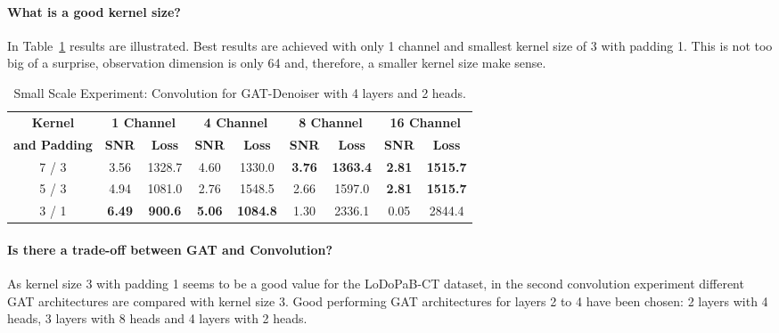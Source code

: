 \paragraph{What is a good kernel size?}

In Table~\ref{tab:small_convolution} results are illustrated. 
Best results are achieved with only 1 channel and smallest kernel size of 3 with padding 1.
This is not too big of a surprise, observation dimension is only 64 and, therefore, a smaller kernel size make sense.


\begin{table}[H]
  \centering
  \begin{tabular}{c|cc|cc|cc|cc}
    \toprule
    \small \textbf{Kernel}  & \multicolumn{2}{c|}{\small \textbf{1 Channel}} & \multicolumn{2}{c|}{\small \textbf{4 Channel}} & \multicolumn{2}{c|}{\small \textbf{8 Channel}} & \multicolumn{2}{c}{\small \textbf{16 Channel}} \\
    \small \textbf{and Padding}  & \small \textbf{SNR} & \small \textbf{Loss} & \small \textbf{SNR} & \small \textbf{Loss} & \small \textbf{SNR} & \small \textbf{Loss} & \small \textbf{SNR} & \small \textbf{Loss} \\ 
    \midrule
      7 / 3 & 3.56 & 1328.7                  & 4.60  &  1330.0                   & \textbf{3.76} & \textbf{1363.4} & \textbf{2.81}  & \textbf{1515.7} \\ \hline
      5 / 3 & 4.94 & 1081.0                  & 2.76  &  1548.5                   & 2.66 & 1597.0                   & \textbf{2.81}  & \textbf{1515.7} \\ \hline
      3 / 1 & \textbf{6.49} & \textbf{900.6} & \textbf{5.06}  &  \textbf{1084.8} & 1.30 & 2336.1                   & 0.05  & 2844.4 \\ \hline

    \midrule
  \end{tabular}

  \caption{Small Scale Experiment: Convolution for GAT-Denoiser with 4 layers and 2 heads.}
  \label{tab:small_convolution}
\end{table}

\paragraph{Is there a trade-off between GAT and Convolution?}

As kernel size 3 with padding 1 seems to be a good value for the LoDoPaB-CT dataset, 
in the second convolution experiment different GAT architectures are compared with kernel size 3.
Good performing GAT architectures for layers 2 to 4 have been chosen: 2 layers with 4 heads, 3 layers with 8 heads
and 4 layers with 2 heads.

